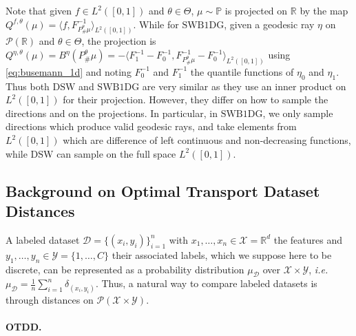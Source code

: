 \documentclass[twoside]{article}
\newcommand{\cP}{\mathcal{P}}
\newcommand{\bP}{\mathbb{P}}
\newcommand{\cD}{\mathcal{D}}
\newcommand{\cX}{\mathcal{X}}
\newcommand{\cY}{\mathcal{Y}}
\newcommand{\R}{\mathbb{R}}
\newcommand{\swbdg}{\mathrm{SWB1DG}}
\begin{document}
Note that given $f\in L^2([0,1])$ and $\theta\in \Theta$, $\mu\sim\bP$ is projected on $\R$ by the map $Q^{f,\theta}(\mu)=\langle f, F_{P^\theta_\#\mu}^{-1}\rangle_{L^2([0,1])}$. While for $\swbdg$, given a geodesic ray $\eta$ on $\cP(\R)$ and $\theta\in \Theta$, the projection is $Q^{\eta,\theta}(\mu)=B^\eta(P^\theta_\#\mu) = -\langle F_1^{-1}-F_0^{-1}, F_{P^\theta_\#\mu}^{-1} - F_0^{-1}\rangle_{L^2([0,1])}$ using \eqref{eq:busemann_1d} and noting $F_0^{-1}$ and $F_1^{-1}$ the quantile functions of $\eta_0$ and $\eta_1$. Thus both $\mathrm{DSW}$ and $\swbdg$ are very similar as they use an inner product on $L^2([0,1])$ for their projection. However, they differ on how to sample the directions and on the projections. In particular, in $\swbdg$, we only sample directions which produce valid geodesic rays, and take elements from $L^2([0,1])$ which are difference of left continuous and non-decreasing functions, while $\mathrm{DSW}$ can sample on the full space $L^2([0,1])$.


\subsection{Background on Optimal Transport Dataset Distances} \label{appendix:otdd}

A labeled dataset $\cD=\{(x_i,y_i)\}_{i=1}^n$ with $x_1,\dots,x_n\in\cX=\R^d$ the features and $y_1,\dots,y_n\in \cY=\{1,\dots,C\}$ their associated labels, which we suppose here to be discrete, can be represented as a probability distribution $\mu_\cD$ over $\cX\times \cY$, \emph{i.e.} $\mu_\cD = \frac{1}{n}\sum_{i=1}^n \delta_{(x_i,y_i)}$. Thus, a natural way to compare labeled datasets is through distances on $\cP(\cX\times \cY)$. 

\paragraph{OTDD.}
\end{document}
